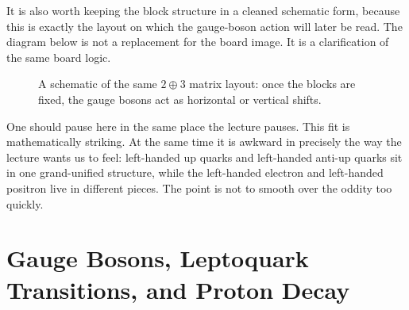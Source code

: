 It is also worth keeping the block structure in a cleaned schematic form, because this is exactly the layout on which the gauge-boson action will later be read. The diagram below is not a replacement for the board image. It is a clarification of the same board logic.

\begin{figure}
\centering
{}
\caption{A schematic of the same \(2\oplus 3\) matrix layout: once the blocks are fixed, the gauge bosons act as horizontal or vertical shifts.}
\end{figure}

One should pause here in the same place the lecture pauses. This fit is mathematically striking. At the same time it is awkward in precisely the way the lecture wants us to feel: left-handed up quarks and left-handed anti-up quarks sit in one grand-unified structure, while the left-handed electron and left-handed positron live in different pieces. The point is not to smooth over the oddity too quickly.

\section{Gauge Bosons, Leptoquark Transitions, and Proton Decay}

